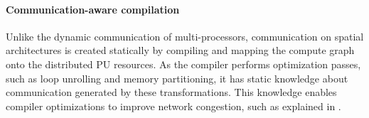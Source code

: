 
\paragraph{Communication-aware compilation}
Unlike the dynamic communication of multi-processors, communication on spatial architectures is created statically by compiling and mapping the compute graph onto the distributed PU resources.
As the compiler performs optimization passes, such as loop unrolling and memory partitioning, it has 
static knowledge about communication generated by these transformations.
This knowledge enables compiler optimizations to improve network congestion, such as explained in
.

